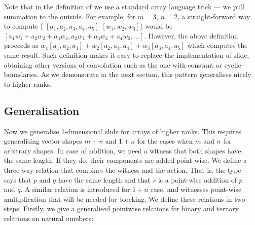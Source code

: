 Note that in the definition of  we use a standard array language
trick --- we pull summation to the outside.  For example, for $m = 3$, $n = 2$,
a straight-forward way to compute ( $[a_1, a_2, a_3, a_4, a_5]$
$[w_1, w_2, w_3]$) would be $[a_1w_1 + a_2w_2 + a_3w_3, a_2w_1 + a_3w_2 +
a_4w_3,\dots]$.  However, the above definition proceeds as $w_1[a_1,a_2,a_3] +
w_2[a_2,a_3,a_4] + w_3[a_3,a_4,a_5]$ which computes the same result.  Such
definition makes it easy to replace the implementation of slide, obtaining
other versions of convolution such as the one with constant or cyclic
boundaries.  As we demonstrate in the next section, this pattern generalises
nicely to higher ranks.



\subsection{Generalisation\label{sec:general-ix-ops}}
Now we generalise 1-dimensional slide for arrays of higher ranks.
This requires generalising vector shapes $m + n$ and $1 + n$ for the cases
when $m$ and $n$ for arbitrary shapes.  In case of addition, we need a witness
that both shapes
have the same length.  If they do, their components are added point-wise.
We define a three-way relation  that combines the witness and
the action.  That is, the type  \AF{+}    says that
$p$ and $q$ have the same length and that $r$ is a point-wise addition
of $p$ and $q$.  A similar relation  is introduced for $1 + n$
case, and  witnesses point-wise
multiplication that will be needed for blocking.  We define these relations
in two steps.  Firstly, we give a generalised pointwise relations for binary
and ternary relations on natural numbers:
